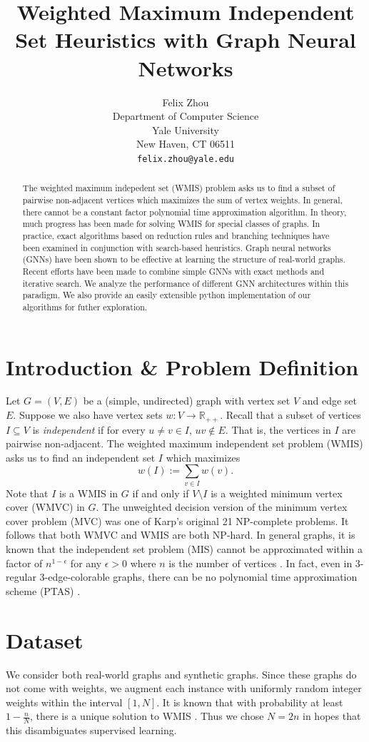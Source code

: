 \documentclass{article}
\title{Weighted Maximum Independent Set Heuristics with Graph Neural Networks}
\author{%
  Felix Zhou\\
  Department of Computer Science\\
  Yale University\\
  New Haven, CT 06511 \\
  \texttt{felix.zhou@yale.edu} \\
}
\newcommand{\R}{\mathbb{R}}
\newcommand{\sset}{\subseteq}
\begin{document}
\maketitle


\begin{abstract}
  The weighted maximum indepedent set (WMIS) problem asks us to find a subset of pairwise non-adjacent vertices
  which maximizes the sum of vertex weights.
  In general, there cannot be a constant factor polynomial time approximation algorithm.
  In theory, much progress has been made for solving WMIS for special classes of graphs.
  In practice, exact algorithms based on reduction rules and branching techniques have been examined
  in conjunction with search-based heuristics.
  Graph neural networks (GNNs) have been shown to be effective at learning the structure of real-world graphs.
  Recent efforts have been made to combine simple GNNs with exact methods and iterative search.
  We analyze the performance of different GNN architectures within this paradigm.
  We also provide an easily extensible python implementation of our algorithms for futher exploration.
\end{abstract}


\section{Introduction \& Problem Definition}
Let $G=(V, E)$ be a (simple, undirected) graph with vertex set $V$
and edge set $E$.
Suppose we also have vertex sets $w: V\to \R_{++}$.
Recall that a subset of vertices $I\sset V$ is \emph{independent}
if for every $u\neq v\in I$, $uv\notin E$.
That is, the vertices in $I$ are pairwise non-adjacent.
The weighted maximum independent set problem (WMIS)
asks us to find an independent set $I$ which maximizes
\[
  w(I) := \sum_{v\in I} w(v).
\]
Note that $I$ is a WMIS in $G$
if and only if $V\setminus I$ is a weighted minimum vertex cover (WMVC) in $G$.
The unweighted decision version of the minimum vertex cover problem (MVC)
was one of Karp's original 21 NP-complete problems.
It follows that both WMVC and WMIS are both NP-hard.
In general graphs,
it is known that the independent set problem (MIS) cannot be approximated within a factor of $n^{1-\epsilon}$ for any $\epsilon > 0$ where $n$ is the number of vertices \citet{zuckerman2006linear}.
In fact, even in 3-regular 3-edge-colorable graphs,
there can be no polynomial time approximation scheme (PTAS) \citet{berman1999appr}.

\section{Dataset}
We consider both real-world graphs and synthetic graphs.
Since these graphs do not come with weights,
we augment each instance with uniformly random integer weights within the interval $[1, N]$.
It is known that with probability at least $1-\frac nN$,
there is a unique solution to WMIS \citet{isolation}.
Thus we chose $N = 2n$ in hopes that this disambiguates supervised learning.
\end{document}
